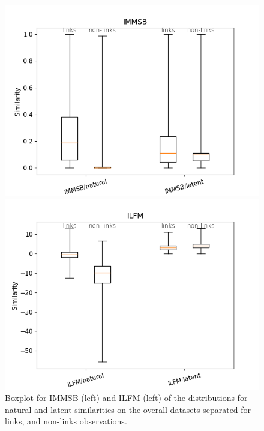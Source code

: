 \begin{figure}[h]
    \centering
        \begin{minipage}{0.24\textwidth}
            \includegraphics[width=\textwidth]{img/corpus/homo_mustach_immsb}
        \end{minipage}
        \begin{minipage}{0.24\textwidth}
            \includegraphics[width=\textwidth]{img/corpus/homo_mustach_ilfm}
        \end{minipage}
        \caption{Boxplot for IMMSB (left) and ILFM (left) of the distributions for natural and latent similarities on the overall datasets separated for links, and non-links observations. }
        \label{fig:homo_mustach}
\end{figure}



